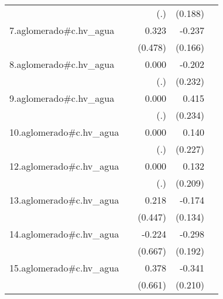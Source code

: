 {\begin{longtable}{l*{4}{D{.}{.}{-1}}}
            &                     &         (.)         &     (0.188)         &                     \\
\addlinespace
7.aglomerado#c.hv\_agua&                     &       0.323         &      -0.237         &                     \\
            &                     &     (0.478)         &     (0.166)         &                     \\
\addlinespace
8.aglomerado#c.hv\_agua&                     &       0.000         &      -0.202         &                     \\
            &                     &         (.)         &     (0.232)         &                     \\
\addlinespace
9.aglomerado#c.hv\_agua&                     &       0.000         &       0.415         &                     \\
            &                     &         (.)         &     (0.234)         &                     \\
\addlinespace
10.aglomerado#c.hv\_agua&                     &       0.000         &       0.140         &                     \\
            &                     &         (.)         &     (0.227)         &                     \\
\addlinespace
12.aglomerado#c.hv\_agua&                     &       0.000         &       0.132         &                     \\
            &                     &         (.)         &     (0.209)         &                     \\
\addlinespace
13.aglomerado#c.hv\_agua&                     &       0.218         &      -0.174         &                     \\
            &                     &     (0.447)         &     (0.134)         &                     \\
\addlinespace
14.aglomerado#c.hv\_agua&                     &      -0.224         &      -0.298         &                     \\
            &                     &     (0.667)         &     (0.192)         &                     \\
\addlinespace
15.aglomerado#c.hv\_agua&                     &       0.378         &      -0.341         &                     \\
            &                     &     (0.661)         &     (0.210)         &                     \\

\end{longtable}}
